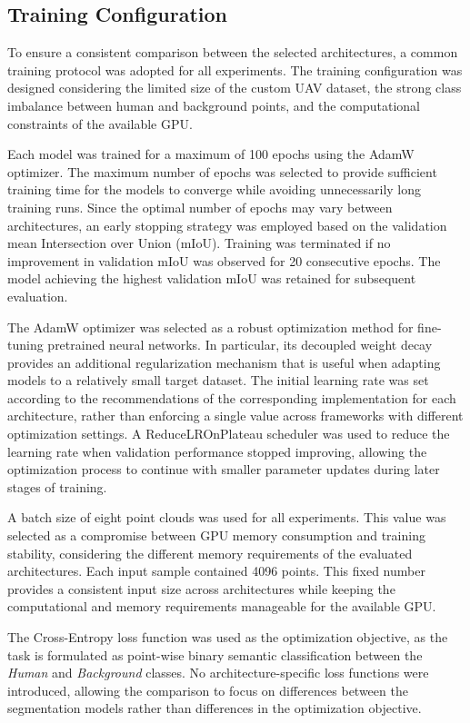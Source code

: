 \subsection{Training Configuration}
\label{subsec:training_configuration}

To ensure a consistent comparison between the selected architectures, a common training protocol was adopted for all experiments. The training configuration was designed considering the limited size of the custom UAV dataset, the strong class imbalance between human and background points, and the computational constraints of the available GPU.

Each model was trained for a maximum of 100 epochs using the AdamW optimizer. The maximum number of epochs was selected to provide sufficient training time for the models to converge while avoiding unnecessarily long training runs. Since the optimal number of epochs may vary between architectures, an early stopping strategy was employed based on the validation mean Intersection over Union (mIoU). Training was terminated if no improvement in validation mIoU was observed for 20 consecutive epochs. The model achieving the highest validation mIoU was retained for subsequent evaluation.

The AdamW optimizer was selected as a robust optimization method for fine-tuning pretrained neural networks. In particular, its decoupled weight decay provides an additional regularization mechanism that is useful when adapting models to a relatively small target dataset. The initial learning rate was set according to the recommendations of the corresponding implementation for each architecture, rather than enforcing a single value across frameworks with different optimization settings. A ReduceLROnPlateau scheduler was used to reduce the learning rate when validation performance stopped improving, allowing the optimization process to continue with smaller parameter updates during later stages of training.

A batch size of eight point clouds was used for all experiments. This value was selected as a compromise between GPU memory consumption and training stability, considering the different memory requirements of the evaluated architectures. Each input sample contained 4096 points. This fixed number provides a consistent input size across architectures while keeping the computational and memory requirements manageable for the available GPU.

The Cross-Entropy loss function was used as the optimization objective, as the task is formulated as point-wise binary semantic classification between the \textit{Human} and \textit{Background} classes. No architecture-specific loss functions were introduced, allowing the comparison to focus on differences between the segmentation models rather than differences in the optimization objective.

